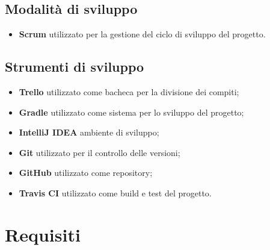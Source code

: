 \documentclass[12pt, english]{report}
\begin{document}
\section{Modalità di sviluppo}
\begin{itemize}
	\item \textbf{Scrum} utilizzato per la gestione del ciclo di sviluppo del progetto.
\end{itemize}
\section{Strumenti di sviluppo}
\begin{itemize}
	\item \textbf{Trello} utilizzato come bacheca per la divisione dei compiti;
	\item \textbf{Gradle} utilizzato come sistema per lo sviluppo del progetto;
	\item \textbf{IntelliJ IDEA} ambiente di sviluppo;
	\item \textbf{Git} utilizzato per il controllo delle versioni;
	\item \textbf{GitHub} utilizzato come repository;
	\item \textbf{Travis CI} utilizzato come build e test del progetto.
\end{itemize}

\chapter{Requisiti}
\end{document}
